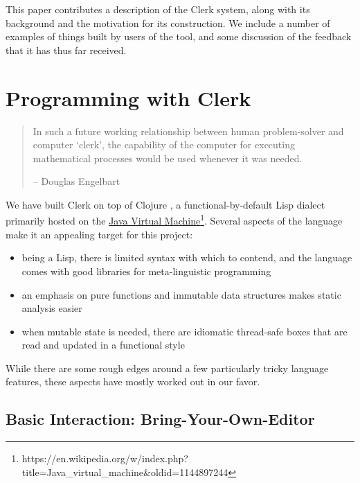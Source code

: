 \documentclass[sigconf,screen,pbalance=true]{acmart}
\providecommand{\tightlist}{%
  \setlength{\itemsep}{0pt}\setlength{\parskip}{0pt}}
\begin{document}
This paper contributes a description of the Clerk system, along with its background and the motivation for its construction. We include a number of examples of things built by users of the tool, and some discussion of the feedback that it has thus far received.

\hypertarget{programming-with-clerk}{%
\section{Programming with Clerk}\label{programming-with-clerk}}

\begin{quote}
In such a future working relationship between human problem-solver and computer `clerk', the capability of the computer for executing mathematical processes would be used whenever it was needed. \cite{Engelbart_1962}

-- Douglas Engelbart
\end{quote}

We have built Clerk on top of Clojure \cite{Hickey_2020}, a functional-by-default Lisp dialect primarily hosted on the {\href{https://en.wikipedia.org/w/index.php?title=Java_virtual_machine\&oldid=1144897244}{Java Virtual Machine}\footnote{https://en.wikipedia.org/w/index.php?title=Java\_virtual\_machine\&oldid=1144897244}}. Several aspects of the language make it an appealing target for this project:

\begin{itemize}
\tightlist
\item
  being a Lisp, there is limited syntax with which to contend, and the language comes with good libraries for meta-linguistic programming
\item
  an emphasis on pure functions and immutable data structures makes static analysis easier
\item
  when mutable state is needed, there are idiomatic thread-safe boxes that are read and updated in a functional style
\end{itemize}

While there are some rough edges around a few particularly tricky language features, these aspects have mostly worked out in our favor.

\hypertarget{basic-interaction:-bring-your-own-editor}{%
\subsection{Basic Interaction: Bring-Your-Own-Editor}\label{basic-interaction:-bring-your-own-editor}}
\end{document}
